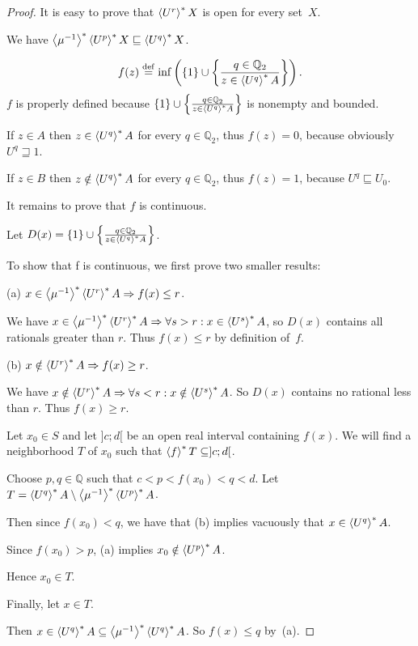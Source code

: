 \begin{proof}
It is easy to prove that $\left\langle U^r\right\rangle ^{\ast}X$ is open for every set~$X$.

We have $\left\langle \mu^{-1}\right\rangle ^{\ast}\left\langle U^p\right\rangle ^{\ast}X\sqsubseteq\left\langle U^q\right\rangle ^{\ast}X$.

\[ f (z) \overset{\mathrm{def}}{=} \inf \left( \{ 1 \} \cup \left\{ \frac{ q \in
   \mathbb{Q}_2 }{ z \in \left\langle U^q\right\rangle ^{\ast}
   A }\right\} \right). \]
$f$ is properly defined because $\{ 1 \} \cup \left\{ \frac{ q \in \mathbb{Q}_2
}{ z \in \left\langle U^q\right\rangle ^{\ast} A }\right\}$ is
nonempty and bounded.

If $z \in A$ then $z \in \left\langle U^q\right\rangle ^{\ast} A$ for every $q \in
\mathbb{Q}_2$, thus $f (z) = 0$, because obviously $U^q \sqsupseteq 1$.

If $z \in B$ then $z \notin \left\langle U^q\right\rangle ^{\ast} A$ for every $q \in
\mathbb{Q}_2$, thus $f (z) = 1$, because $U^q \sqsubseteq U_0$.

It remains to prove that $f$ is continuous.

Let $D (x) = \{ 1 \} \cup \left\{ \frac{ q \in \mathbb{Q}_2 }{
z \in \left\langle U^q\right\rangle ^{\ast} A }\right\}$.

To show that f is continuous, we first prove two smaller results:

(a) $x\in\left\langle \mu^{-1}\right\rangle ^{\ast}\left\langle U^r\right\rangle ^{\ast}A \Rightarrow f(x)\leq r$.

We have $x\in\left\langle \mu^{-1}\right\rangle ^{\ast}\left\langle U^r\right\rangle ^{\ast}A \Rightarrow \forall s>r:x\in\left\langle U^s\right\rangle ^{\ast}A$,
so $D(x)$ contains all rationals greater than $r$. Thus $f(x)\leq r$ by definition of~$f$.

(b) $x\notin\left\langle U^r\right\rangle ^{\ast}A \Rightarrow f(x)\geq r$.

We have $x\notin\left\langle U^r\right\rangle ^{\ast}A \Rightarrow \forall s<r:x\notin\left\langle U^s\right\rangle ^{\ast}A$.
So $D(x)$ contains no rational less than $r$. Thus $f(x)\geq r$.

Let $x_0\in S$ and let $]c;d[$ be an open real interval containing $f(x)$.
We will find a neighborhood $T$ of $x_0$ such that $\left\langle f\right\rangle ^{\ast}T\subseteq]c;d[$.

Choose $p,q\in\mathbb{Q}$ such that $c < p < f(x_0) < q < d$. Let $T=\left\langle U^q\right\rangle ^{\ast}A\setminus\left\langle \mu^{-1}\right\rangle ^{\ast}\left\langle U^p\right\rangle ^{\ast}A$.

Then since $f(x_0)<q$, we have that (b) implies vacuously that $x\in\left\langle U^q\right\rangle ^{\ast}A$.

Since $f(x_0)>p$, (a) implies $x_0\notin\left\langle U^p\right\rangle ^{\ast}A$.

Hence $x_0\in T$.

Finally, let $x\in T$.

Then $x\in\left\langle U^q\right\rangle ^{\ast}A\subseteq\left\langle \mu^{-1}\right\rangle ^{\ast}\left\langle U^q\right\rangle ^{\ast}A$. So $f(x)\leq q$ by~(a).


\end{proof}
